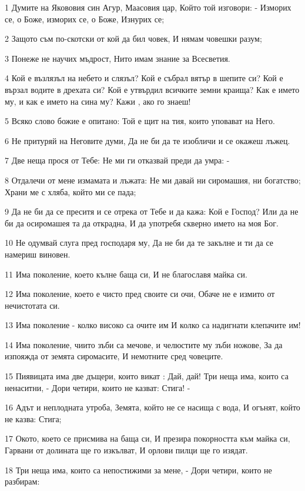 \par 1 Думите на Якововия син Агур, Маасовия цар, Който той изговори: - Изморих се, о Боже, изморих се, о Боже, Изнурих се;
\par 2 Защото съм по-скотски от кой да бил човек, И нямам човешки разум;
\par 3 Понеже не научих мъдрост, Нито имам знание за Всесветия.
\par 4 Кой е възлязъл на небето и слязъл? Кой е събрал вятър в шепите си? Кой е вързал водите в дрехата си? Кой е утвърдил всичките земни краища? Как е името му, и как е името на сина му? Кажи , ако го знаеш!
\par 5 Всяко слово божие е опитано: Той е щит на тия, които уповават на Него.
\par 6 Не притуряй на Неговите думи, Да не би да те изобличи и се окажеш лъжец.
\par 7 Две неща прося от Тебе: Не ми ги отказвай преди да умра: -
\par 8 Отдалечи от мене измамата и лъжата: Не ми давай ни сиромашия, ни богатство; Храни ме с хляба, който ми се пада;
\par 9 Да не би да се преситя и се отрека от Тебе и да кажа: Кой е Господ? Или да не би да осиромашея та да открадна, И да употребя скверно името на моя Бог.
\par 10 Не одумвай слуга пред господаря му, Да не би да те закълне и ти да се намериш виновен.
\par 11 Има поколение, което кълне баща си, И не благославя майка си.
\par 12 Има поколение, което е чисто пред своите си очи, Обаче не е измито от нечистотата си.
\par 13 Има поколение - колко високо са очите им И колко са надигнати клепачите им!
\par 14 Има поколение, чиито зъби са мечове, и челюстите му зъби ножове, За да изпояжда от земята сиромасите, И немотните сред човеците.
\par 15 Пиявицата има две дъщери, които викат : Дай, дай! Три неща има, които са ненаситни, - Дори четири, които не казват: Стига! -
\par 16 Адът и неплодната утроба, Земята, който не се насища с вода, И огънят, който не казва: Стига;
\par 17 Окото, което се присмива на баща си, И презира покорността към майка си, Гарвани от долината ще го изкълват, И орлови пилци ще го изядат.
\par 18 Три неща има, които са непостижими за мене, - Дори четири, които не разбирам:
